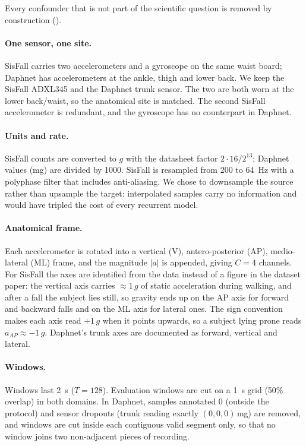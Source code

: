 Every confounder that is not part of the scientific question is removed by construction
().

\paragraph{One sensor, one site.} SisFall carries two accelerometers and a gyroscope on the same
waist board; Daphnet has accelerometers at the ankle, thigh and lower back. We keep the SisFall
ADXL345 and the Daphnet trunk sensor. The two are both worn at the lower back/waist, so the
anatomical site is matched. The second SisFall accelerometer is redundant, and the gyroscope has no
counterpart in Daphnet.

\paragraph{Units and rate.} SisFall counts are converted to $g$ with the datasheet factor
$2\cdot 16/2^{13}$; Daphnet values (mg) are divided by 1000. SisFall is resampled from 200 to
\SI{64}{\hertz} with a polyphase filter that includes anti-aliasing. We chose to downsample the source
rather than upsample the target: interpolated samples carry no information and would have tripled
the cost of every recurrent model.

\paragraph{Anatomical frame.} Each accelerometer is rotated into a vertical (V), antero-posterior
(AP), medio-lateral (ML) frame, and the magnitude $|a|$ is appended, giving $C=4$ channels. For
SisFall the axes are identified from the data instead of a figure in the dataset paper: the
vertical axis carries $\approx 1\,g$ of static acceleration during walking, and after a fall the
subject lies still, so gravity ends up on the AP axis for forward and backward falls and on the ML
axis for lateral ones. The sign convention makes each axis read $+1\,g$ when it points upwards, so a
subject lying prone reads $a_{AP}\approx-1\,g$. Daphnet's trunk axes are documented as forward,
vertical and lateral.

\paragraph{Windows.} Windows last \SI{2}{\second} ($T=128$). Evaluation windows are cut on a \SI{1}{\second}
grid (50\% overlap) in both domains. In Daphnet, samples annotated 0 (outside the protocol) and
sensor dropouts (trunk reading exactly $(0,0,0)$\,mg) are removed, and windows are cut inside each
contiguous valid segment only, so that no window joins two non-adjacent pieces of recording.

